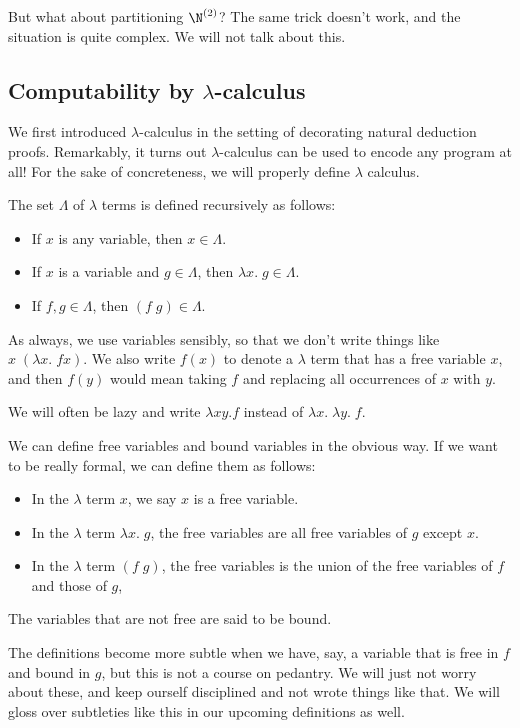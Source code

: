 \documentclass[a4paper]{article}
\begin{document}
But what about partitioning $\N^{(2)}$? The same trick doesn't work, and the situation is quite complex. We will not talk about this.

\subsection{Computability by \texorpdfstring{$\lambda$}{lambda}-calculus} %
We first introduced $\lambda$-calculus in the setting of decorating natural deduction proofs. Remarkably, it turns out $\lambda$-calculus can be used to encode any program at all! For the sake of concreteness, we will properly define $\lambda$ calculus.

\begin{defi}
  The set $\Lambda$ of $\lambda$ terms is defined recursively as follows:
  \begin{itemize}
    \item If $x$ is any variable, then $x \in \Lambda$.
    \item If $x$ is a variable and $g \in \Lambda$, then $\lambda x.\; g \in \Lambda$.
    \item If $f, g \in \Lambda$, then $(f\; g) \in \Lambda$.
  \end{itemize}
\end{defi}
As always, we use variables sensibly, so that we don't write things like $x\;(\lambda x.\; f x)$. We also write $f(x)$ to denote a $\lambda$ term that has a free variable $x$, and then $f(y)$ would mean taking $f$ and replacing all occurrences of $x$ with $y$.

We will often be lazy and write $\lambda xy. f$ instead of $\lambda x.\; \lambda y.\; f$.

We can define free variables and bound variables in the obvious way. If we want to be really formal, we can define them as follows:
\begin{defi}\leavevmode
  \begin{itemize}
    \item In the $\lambda$ term $x$, we say $x$ is a free variable.
    \item In the $\lambda$ term $\lambda x.\; g$, the free variables are all free variables of $g$ except $x$.
    \item In the $\lambda$ term $(f\; g)$, the free variables is the union of the free variables of $f$ and those of $g$,
  \end{itemize}
  The variables that are not free are said to be bound.
\end{defi}
The definitions become more subtle when we have, say, a variable that is free in $f$ and bound in $g$, but this is not a course on pedantry. We will just not worry about these, and keep ourself disciplined and not wrote things like that. We will gloss over subtleties like this in our upcoming definitions as well.
\end{document}
